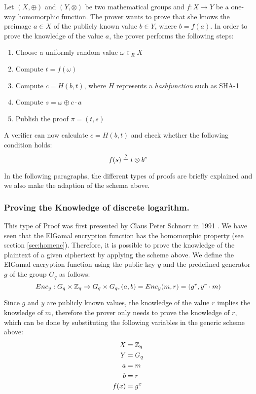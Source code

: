\documentclass[numbers=noenddot, abstract=on, a4paper, headsepline,
footsepline, oneside, draft=off]{scrreprt}
\newcommand{\myref}[1]{(see section \vref{#1})}
\begin{document}
Let $(X,\oplus)$ and $(Y,\otimes)$ be two mathematical groups and
$f:X \rightarrow Y$ be a one-way homomorphic function. The prover wants to prove
that she knows the preimage $a \in X$ of the publicly known value $b \in Y$,
where $b=f(a)$. In order to prove the knowledge of the value $a$, the prover
performs the following steps:
\begin{enumerate}
  \item Choose a uniformly random value $\omega \in_R X$
  \item Compute $t=f(\omega)$
  \item Compute $c=H(b,t)$, where $H$ represents a \textit{hashfunction} such as
  SHA-1
  \item Compute $s=\omega \oplus c \cdot a$
  \item Publish the proof $\pi = (t,s)$
\end{enumerate}

A verifier can now calculate $c=H(b,t)$ and check whether the following
condition holds:
\begin{equation}
	f(s) \stackrel{?}{=} t \otimes b^c \notag
\end{equation}

 In the following paragraphs, the different types of proofs are briefly
 explained and we also make the adaption of the schema above.
 
\subsubsection{Proving the Knowledge of discrete logarithm.}
This type of Proof was first presented by Claus Peter Schnorr in 1991
\cite{Schnorr91}. We have seen that the ElGamal encryption function has the
homomorphic property \myref{sec:homenc}. Therefore, it is possible to prove the
knowledge of the plaintext of a given ciphertext by applying the scheme above.
We define the ElGamal encryption function using the public key $y$ and the
predefined generator $g$ of the group $G_q$ as follows:
\begin{equation}
	Enc_y:G_q \times \mathbb{Z}_q \rightarrow G_q \times G_q, (a,b) = Enc_y(m,
	r)=(g^r, y^r \cdot m) \notag
\end{equation} 

Since $g$ and $y$ are publicly known values, the knowledge of the value $r$
implies the knowledge of $m$, therefore the prover only needs to prove the
knowledge of $r$, which can be done by substituting the following variables in
the generic scheme above:
\begin{align}
  X &= \mathbb{Z}_q \notag \\
  Y &= G_q \notag \\
  a &=m \notag \\
  b &=r \notag \\
  f(x) &= g^x \notag
\end{align} 
\end{document}
